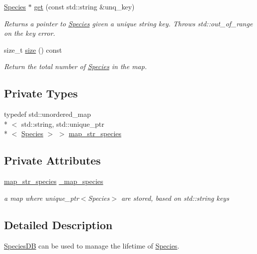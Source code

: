 \begin{DoxyCompactItemize}
\hyperlink{classchem_1_1Species}{Species} $\ast$ \hyperlink{classchem_1_1SpeciesDB_a15138c702e8a942adef5767915c3b846}{get} (const std\-::string \&unq\-\_\-key)
\begin{DoxyCompactList}\small\item\em Returns a pointer to \hyperlink{classchem_1_1Species}{Species} given a unique string key. Throws std\-::out\-\_\-of\-\_\-range on the key error. \end{DoxyCompactList}\item 
size\-\_\-t \hyperlink{classchem_1_1SpeciesDB_a452e04c1e03e36d39f8593a10717644b}{size} () const 
\begin{DoxyCompactList}\small\item\em Return the total number of \hyperlink{classchem_1_1Species}{Species} in the map. \end{DoxyCompactList}\end{DoxyCompactItemize}
\subsection*{Private Types}
\begin{DoxyCompactItemize}
\item 
typedef std\-::unordered\-\_\-map\\*
$<$ std\-::string, std\-::unique\-\_\-ptr\\*
$<$ \hyperlink{classchem_1_1Species}{Species} $>$ $>$ \hyperlink{classchem_1_1SpeciesDB_a158e832778baeefa4add8b27f4e0bdec}{map\-\_\-str\-\_\-species}
\end{DoxyCompactItemize}
\subsection*{Private Attributes}
\begin{DoxyCompactItemize}
\item 
\hyperlink{classchem_1_1SpeciesDB_a158e832778baeefa4add8b27f4e0bdec}{map\-\_\-str\-\_\-species} \hyperlink{classchem_1_1SpeciesDB_a5ddee3589ef15bfba1f2b98e8ea6aca5}{\-\_\-map\-\_\-species}
\begin{DoxyCompactList}\small\item\em a map where unique\-\_\-ptr$<$\-Species$>$ are stored, based on std\-::string keys \end{DoxyCompactList}\end{DoxyCompactItemize}


\subsection{Detailed Description}
\hyperlink{classchem_1_1SpeciesDB}{Species\-D\-B} can be used to manage the lifetime of \hyperlink{classchem_1_1Species}{Species}. 

